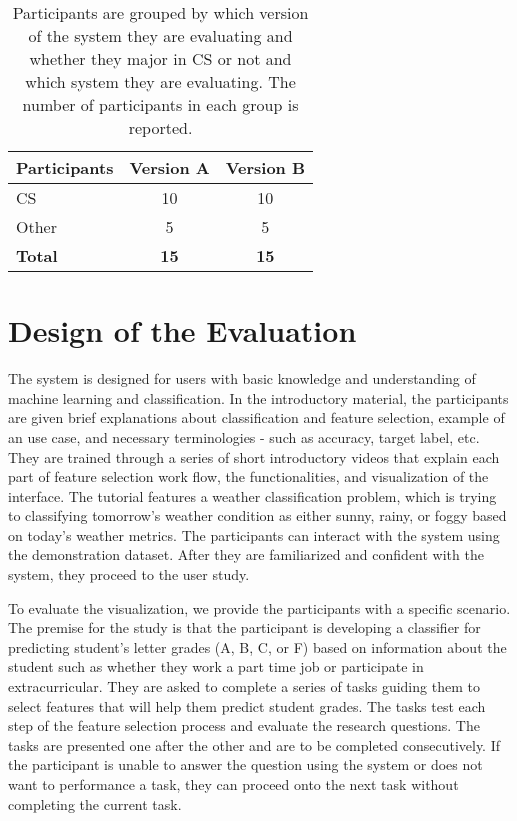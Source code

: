 \begin{table}[]
\centering
\begin{tabular}{lcc}
\hline
Participants &  \multicolumn{1}{l}{Version A} &  \multicolumn{1}{l}{Version B} \\ \hline
CS           & 10        & 10        \\
Other       & 5         & 5         \\ \hline
\textbf{Total}        & \textbf{15}        & \textbf{15}        \\ \hline
\end{tabular}
\caption{Participants are grouped by which version of the system they are evaluating and whether they major in CS or not and which system they are evaluating. The number of participants in each group is reported. }
\label{ParticipantInfo}
\end{table}

\section{Design of the Evaluation}
The system is designed for users with basic knowledge and understanding of machine learning and classification. In the introductory material, the participants are given brief explanations about classification and feature selection, example of an use case, and necessary terminologies - such as accuracy, target label, etc. They are trained through a series of short introductory videos that explain each part of feature selection work flow, the functionalities, and visualization of the interface. The tutorial features a weather classification problem, which is trying to classifying tomorrow's weather condition as either sunny, rainy, or foggy based on today's weather metrics. The participants can interact with the system using the demonstration dataset. After they are familiarized and confident with the system, they proceed to the user study.

To evaluate the visualization, we provide the participants with a specific scenario. The premise for the study is that the participant is developing a classifier for predicting student's letter grades (A, B, C, or F) based on information about the student such as whether they work a part time job or participate in extracurricular. They are asked to complete a series of tasks guiding them to select features that will help them predict student grades. The tasks test each step of the feature selection process and evaluate the research questions. The tasks are presented one after the other and are to be completed consecutively. If the participant is unable to answer the question using the system or does not want to performance a task, they can proceed onto the next task without completing the current task.


